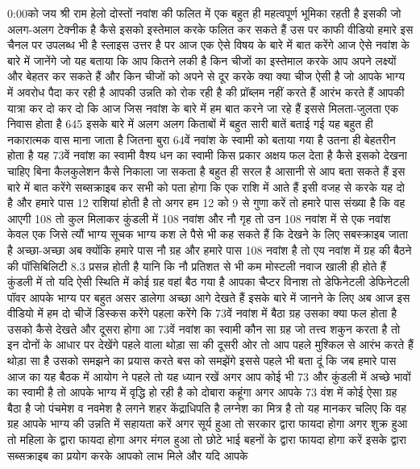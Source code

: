 0:00को जय श्री राम हेलो दोस्तों नवांश की फलित में एक बहुत ही महत्वपूर्ण भूमिका रहती है इसकी जो
अलग-अलग टेक्नीक है कैसे इसको इस्तेमाल करके फलित कर सकते हैं उस पर काफी वीडियो हमारे इस चैनल पर उपलब्ध भी है स्लाइस
उत्तर है पर आज एक ऐसे विषय के बारे में बात करेंगे आज ऐसे नवांश के बारे में जानेंगे जो यह बताया कि आप कितने लकी है
किन चीजों का इस्तेमाल करके आप अपने लक्ष्यों और बेहतर कर सकते हैं और किन
चीजों को अपने से दूर करके क्या क्या चीज ऐसी है जो आपके भाग्य में अवरोध पैदा कर रही है आपकी उन्नति को रोक रही है
की प्रॉब्लम नहीं करते हैं आरंभ करते हैं आपकी यात्रा कर दो
कर दो कि आज जिस नवांश के बारे में हम बात करने जा रहे हैं इससे मिलता-जुलता एक निवास
होता है 645 इसके बारे में अलग अलग किताबों में बहुत सारी बातें बताई गई यह बहुत ही नकारात्मक वास माना जाता है जितना
बुरा 64वें नवांश के स्वामी को बताया गया है उतना ही बेहतरीन होता है यह 73वें नवांश का स्वामी वैश्य धन का स्वामी किस
प्रकार अक्षय फल देता है कैसे इसको देखना चाहिए बिना कैलकुलेशन कैसे निकाला जा सकता है बहुत ही सरल है आसानी से आप बता सकते
हैं इस बारे में बात करेंगे सब्सक्राइब कर
सभी को पता होगा कि एक राशि में आते हैं इसी वजह से करके यह दो
है और हमारे पास 12 राशियां होती है तो अगर हम 12 को 9 से गुणा करें तो हमारे पास
संख्या है कि वह आएगी 108 तो कुल मिलाकर कुंडली में 108 नवांश और नौ गृह तो उन 108
नवांश में से एक नवांश केवल एक जिसे त्यौं भाग्य सूचक भाग्य कश ले पैसे भी कह सकते
हैं कि देखने के लिए सबस्क्राइब जाता है अच्छा-अच्छा अब क्योंकि हमारे पास नौ ग्रह
और हमारे पास 108 नवांश है तो एय नवांश में ग्रह की बैठने की पॉसिबिलिटी 8.3
प्रसन्न होती है यानि कि नौ प्रतिशत से भी कम मोस्टली नवाज खाली ही होते हैं कुंडली में तो यदि ऐसी स्थिति में कोई ग्रह वहां
बैठ गया है आपका चैप्टर विनाश तो डेफिनेटली डेफिनेटली पॉवर आपके भाग्य पर
बहुत असर डालेगा अच्छा आगे देखते हैं इसके बारे में जानने के लिए अब आज इस वीडियो
में हम दो चीजें डिस्कस करेंगे पहला करेंगे कि 73वें नवांश में बैठा ग्रह उसका क्या फल होता है उसको कैसे देखते और दूसरा
होगा आ 73वें नवांश का स्वामी कौन सा ग्रह जो तत्त्व शकुन करता है तो इन दोनों के
आधार पर देखेंगे पहले वाला थोड़ा सा की दूसरी ओर तो आप पहले मुश्किल से आरंभ करते
हैं थोड़ा सा है उसको समझने का प्रयास करते बस को समझेंगे इससे पहले भी बता दूं कि जब हमारे
पास आज का यह बैठक में आयोग ने पहले तो यह
ध्यान रखें अगर आप कोई भी 73 और कुंडली
में अच्छे भावों का स्वामी है तो आपके भाग्य में वृद्धि हो रही है
को दोबारा कहूंगा अगर आपके 73 वंश में कोई ऐसा ग्रह बैठा है जो पंचमेश व नवमेश है
लगने शहर केंद्राधिपति है लग्नेश का मित्र है तो यह मानकर चलिए कि वह ग्रह आपके भाग्य की उन्नति में सहायता करें अगर
सूर्य हुआ तो सरकार द्वारा फायदा होगा अगर शुक्र हुआ तो महिला के द्वारा फायदा होगा अगर मंगल हुआ तो छोटे भाई बहनों के द्वारा
फायदा होगा करें इसके द्वारा सब्सक्राइब का प्रयोग करके आपको लाभ मिले और यदि आपके
